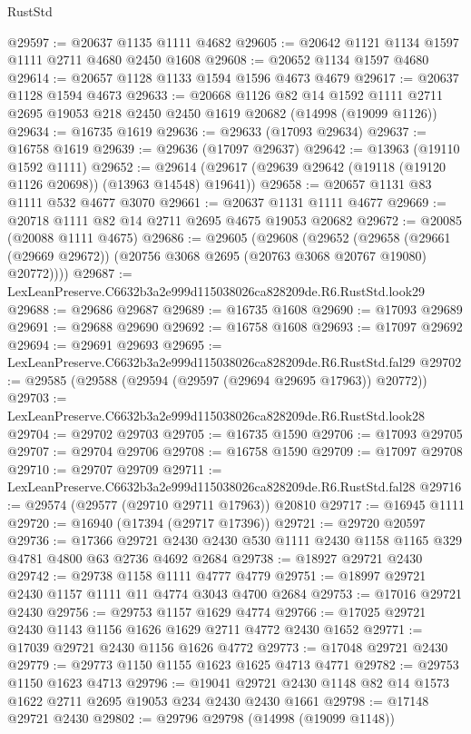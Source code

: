 \begin{lexlean}{RustStd}
\begin{coremodule}
@29597 := @20637 @1135 @1111 @4682
@29605 := @20642 @1121 @1134 @1597 @1111 @2711 @4680 @2450 @1608
@29608 := @20652 @1134 @1597 @4680
@29614 := @20657 @1128 @1133 @1594 @1596 @4673 @4679
@29617 := @20637 @1128 @1594 @4673
@29633 := @20668
    @1126
    @82
    @14
    @1592
    @1111
    @2711
    @2695
    @19053
    @218
    @2450
    @2450
    @1619
    @20682
    (@14998 (@19099 @1126))
@29634 := @16735 @1619
@29636 := @29633 (@17093 @29634)
@29637 := @16758 @1619
@29639 := @29636 (@17097 @29637)
@29642 := @13963 (@19110 @1592 @1111)
@29652 := @29614 (@29617 (@29639 @29642 (@19118 (@19120 @1126 @20698)) (@13963 @14548) @19641))
@29658 := @20657 @1131 @83 @1111 @532 @4677 @3070
@29661 := @20637 @1131 @1111 @4677
@29669 := @20718 @1111 @82 @14 @2711 @2695 @4675 @19053 @20682
@29672 := @20085 (@20088 @1111 @4675)
@29686 := @29605
    (@29608
      (@29652
        (@29658 (@29661 (@29669 @29672)) (@20756 @3068 @2695 (@20763 @3068 @20767 @19080) @20772))))
@29687 := LexLeanPreserve.C6632b3a2e999d115038026ca828209de.R6.RustStd.look29
@29688 := @29686 @29687
@29689 := @16735 @1608
@29690 := @17093 @29689
@29691 := @29688 @29690
@29692 := @16758 @1608
@29693 := @17097 @29692
@29694 := @29691 @29693
@29695 := LexLeanPreserve.C6632b3a2e999d115038026ca828209de.R6.RustStd.fal29
@29702 := @29585 (@29588 (@29594 (@29597 (@29694 @29695 @17963)) @20772))
@29703 := LexLeanPreserve.C6632b3a2e999d115038026ca828209de.R6.RustStd.look28
@29704 := @29702 @29703
@29705 := @16735 @1590
@29706 := @17093 @29705
@29707 := @29704 @29706
@29708 := @16758 @1590
@29709 := @17097 @29708
@29710 := @29707 @29709
@29711 := LexLeanPreserve.C6632b3a2e999d115038026ca828209de.R6.RustStd.fal28
@29716 := @29574 (@29577 (@29710 @29711 @17963)) @20810
@29717 := @16945 @1111
@29720 := @16940 (@17394 (@29717 @17396))
@29721 := @29720 @20597
@29736 := @17366
    @29721
    @2430
    @2430
    @530
    @1111
    @2430
    @1158
    @1165
    @329
    @4781
    @4800
    @63
    @2736
    @4692
    @2684
@29738 := @18927 @29721 @2430
@29742 := @29738 @1158 @1111 @4777 @4779
@29751 := @18997 @29721 @2430 @1157 @1111 @11 @4774 @3043 @4700 @2684
@29753 := @17016 @29721 @2430
@29756 := @29753 @1157 @1629 @4774
@29766 := @17025 @29721 @2430 @1143 @1156 @1626 @1629 @2711 @4772 @2430 @1652
@29771 := @17039 @29721 @2430 @1156 @1626 @4772
@29773 := @17048 @29721 @2430
@29779 := @29773 @1150 @1155 @1623 @1625 @4713 @4771
@29782 := @29753 @1150 @1623 @4713
@29796 := @19041 @29721 @2430 @1148 @82 @14 @1573 @1622 @2711 @2695 @19053 @234 @2430 @2430 @1661
@29798 := @17148 @29721 @2430
@29802 := @29796 @29798 (@14998 (@19099 @1148))

\end{coremodule}
\end{lexlean}
